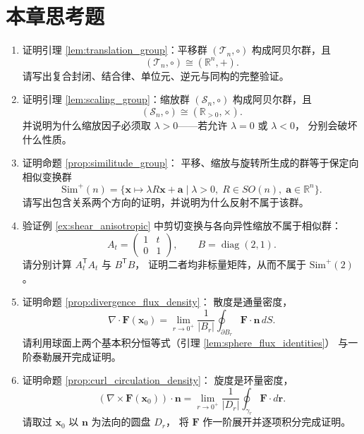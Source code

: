 \section*{本章思考题}

\begin{enumerate}[leftmargin=3em, label=\textbf{题 \arabic*}]
    \item 证明引理 \ref{lem:translation_group}：平移群
    $(\mathcal{T}_n,\circ)$ 构成阿贝尔群，且
    \[
    (\mathcal{T}_n,\circ)\cong(\mathbb{R}^n,+).
    \]
    请写出复合封闭、结合律、单位元、逆元与同构的完整验证。

    \item 证明引理 \ref{lem:scaling_group}：缩放群
    $(\mathcal{S}_n,\circ)$ 构成阿贝尔群，且
    \[
    (\mathcal{S}_n,\circ)\cong(\mathbb{R}_{>0},\times).
    \]
    并说明为什么缩放因子必须取 $\lambda>0$——若允许 $\lambda=0$ 或 $\lambda<0$，
    分别会破坏什么性质。

    \item 证明命题 \ref{prop:similitude_group}：
    平移、缩放与旋转所生成的群等于保定向相似变换群
    \[
    \mathrm{Sim}^{+}(n)=\{\mathbf{x}\mapsto\lambda R\mathbf{x}+\mathbf{a}\mid
    \lambda>0,\;R\in SO(n),\;\mathbf{a}\in\mathbb{R}^n\}.
    \]
    请写出包含关系两个方向的证明，并说明为什么反射不属于该群。

    \item 验证例 \ref{ex:shear_anisotropic} 中剪切变换与各向异性缩放不属于相似群：
    \[
    A_t=\begin{pmatrix}1&t\\0&1\end{pmatrix},\qquad
    B=\operatorname{diag}(2,1).
    \]
    请分别计算 $A_t^{\mathsf T}A_t$ 与 $B^{\mathsf T}B$，
    证明二者均非标量矩阵，从而不属于 $\mathrm{Sim}^{+}(2)$。

    \item 证明命题 \ref{prop:divergence_flux_density}：
    散度是通量密度，
    \[
    \nabla\cdot\mathbf{F}(\mathbf{x}_0)
    =\lim_{r\to0^+}\frac{1}{|B_r|}\oint_{\partial B_r}\mathbf{F}\cdot\mathbf{n}\,dS.
    \]
    请利用球面上两个基本积分恒等式（引理 \ref{lem:sphere_flux_identities}）
    与一阶泰勒展开完成证明。

    \item 证明命题 \ref{prop:curl_circulation_density}：
    旋度是环量密度，
    \[
    (\nabla\times\mathbf{F}(\mathbf{x}_0))\cdot\mathbf{n}
    =\lim_{r\to0^+}\frac{1}{|D_r|}\oint_{\gamma_r}\mathbf{F}\cdot d\mathbf{r}.
    \]
    请取过 $\mathbf{x}_0$ 以 $\mathbf{n}$ 为法向的圆盘 $D_r$，
    将 $\mathbf{F}$ 作一阶展开并逐项积分完成证明。


\end{enumerate}
